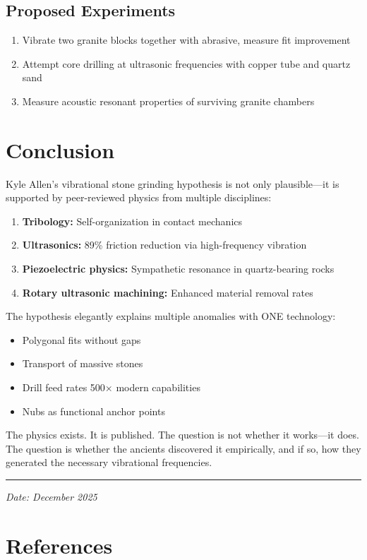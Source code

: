 \documentclass[11pt]{article}
\begin{document}
\subsection{Proposed Experiments}
\begin{enumerate}
    \item Vibrate two granite blocks together with abrasive, measure fit improvement
    \item Attempt core drilling at ultrasonic frequencies with copper tube and quartz sand
    \item Measure acoustic resonant properties of surviving granite chambers
\end{enumerate}

\section{Conclusion}

Kyle Allen's vibrational stone grinding hypothesis is not only plausible---it is supported by peer-reviewed physics from multiple disciplines:

\begin{enumerate}
    \item \textbf{Tribology:} Self-organization in contact mechanics
    \item \textbf{Ultrasonics:} 89\% friction reduction via high-frequency vibration
    \item \textbf{Piezoelectric physics:} Sympathetic resonance in quartz-bearing rocks
    \item \textbf{Rotary ultrasonic machining:} Enhanced material removal rates
\end{enumerate}

The hypothesis elegantly explains multiple anomalies with ONE technology:
\begin{itemize}
    \item Polygonal fits without gaps
    \item Transport of massive stones
    \item Drill feed rates 500$\times$ modern capabilities
    \item Nubs as functional anchor points
\end{itemize}

The physics exists. It is published. The question is not whether it works---it does. The question is whether the ancients discovered it empirically, and if so, how they generated the necessary vibrational frequencies.

\vspace{2em}
\hrule
\vspace{1em}
\textit{Date: December 2025}

\section*{References}


\end{document}

